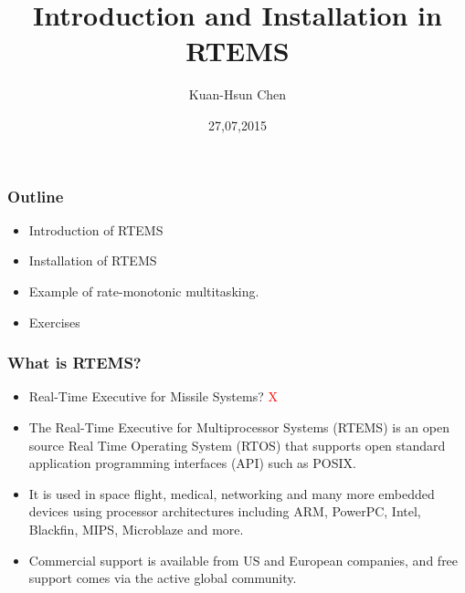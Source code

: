 \documentclass[t]{beamer}
\title{Introduction and Installation in RTEMS}
\author{Kuan-Hsun Chen}
\institute{LS 12, TU Dortmund}
\date{27,07,2015}
\newcommand{\red}[1]{\textcolor{red}{#1}}
\begin{document}
\maketitle

\begin{frame}
\frametitle{Outline}

\begin{itemize}

\item Introduction of RTEMS
\label{sec-1-1}%


\item Installation of RTEMS
\label{sec-1-2}%

\item Example of rate-monotonic multitasking.
\label{sec-1-3}%

\item Exercises
\label{sec-1-4}%

\end{itemize} %
\end{frame}

\begin{frame}
\frametitle{What is RTEMS?}
\label{sec-2}
\begin{itemize}

\item Real-Time Executive for Missile Systems? \red{X}
\label{sec-2-1}%
\item The Real-Time Executive for Multiprocessor Systems (RTEMS) is an open source Real Time Operating System (RTOS) that supports open standard application programming interfaces (API) such as POSIX. 
\label{sec-2-2}%
\item It is used in space flight, medical, networking and many more embedded devices using processor 
architectures including ARM, PowerPC, Intel, Blackfin, MIPS, Microblaze and more. 
\label{sec-2-3}%
\item Commercial support is available from US and European companies, and free support comes via the active global community.
\label{sec-2-4}%

\end{itemize} %
\end{frame}
\end{document}
